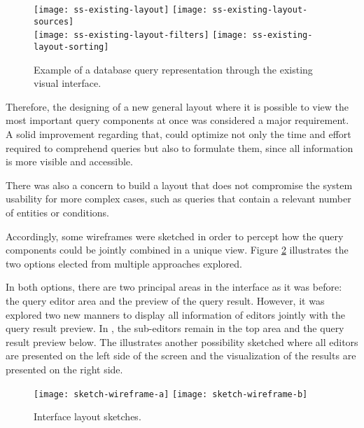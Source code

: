 \begin{figure}[tb]
    \centering
      {\texttt{[image: ss-existing-layout]}}%
      {\texttt{[image: ss-existing-layout-sources]}}%
      \\
    {\texttt{[image: ss-existing-layout-filters]}}%
    {\texttt{[image: ss-existing-layout-sorting]}}%
  \caption{Example of a database query representation through the existing visual interface.}
    \label{fig:example_of_query_representation}
\end{figure}

Therefore, the designing of a new general layout where it is possible to view the most important query components at once was considered a major requirement. A solid improvement regarding that, could optimize not only the time and effort required to comprehend queries but also to formulate them, since all information is more visible and accessible.

There was also a concern to build a layout that does not compromise the system usability for more complex cases, such as queries that contain a relevant number of entities or conditions.

Accordingly, some wireframes were sketched in order to percept how the query components could be jointly combined in a unique view. Figure \ref{fig:sketch_wireframes} illustrates the two options elected from multiple approaches explored.

In both options, there are two principal areas in the interface as it was before: the query editor area and the preview of the query result. However, it was explored two new manners to display all information of editors jointly with the query result preview. In , the sub-editors remain in the top area and the query result preview below. The  illustrates another possibility sketched where all editors are presented on the left side of the screen and the visualization of the results are presented on the right side.

\begin{figure}[tb]
  \centering
    {\texttt{[image: sketch-wireframe-a]}}%
  {\texttt{[image: sketch-wireframe-b]}}%
\caption{Interface layout sketches.}
  \label{fig:sketch_wireframes}
\end{figure}

